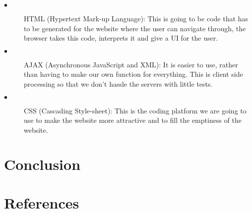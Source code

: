 \documentclass[12pt]{article}
\begin{document}
\begin{description}
  \item[$\bullet$] HTML (Hypertext Mark-up Language):
  This is going to be code that has to be generated for the website where the user can navigate through, the browser takes this code, interprets it and give a UI for the user. 
  
  \item[$\bullet$] AJAX (Asynchronous JavaScript and XML):
  It is easier to use, rather than having to make our own function for everything. This is client side processing so that we don’t hassle the servers with little tests.
  
  \item[$\bullet$] CSS (Cascading Style-sheet):
  This is the coding platform we are going to use to make the website more attractive and to fill the emptiness of the website.
\end{description}

\section{Conclusion}

\section{References}
\end{document}
